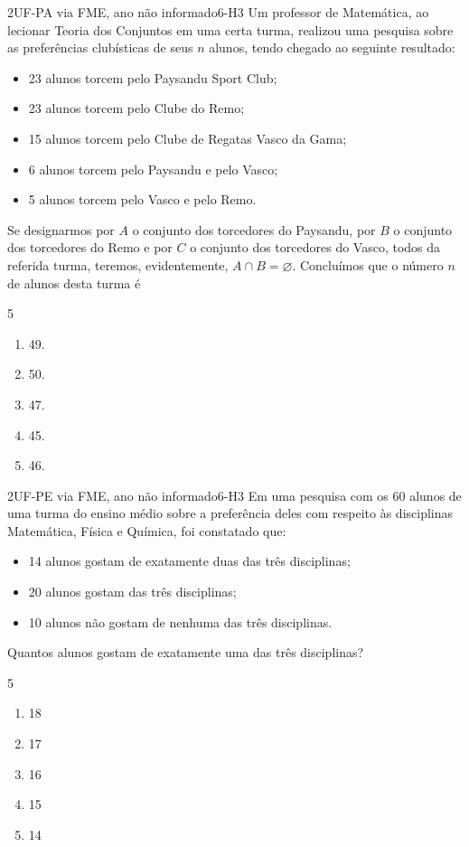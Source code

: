 \begin{questao}{2}{UF-PA via FME, ano não informado}{6-H3}\label{u6:ufpa26}
Um professor de Matemática, ao lecionar Teoria dos Conjuntos em uma certa turma, realizou uma pesquisa sobre as preferências clubísticas de seus $n$ alunos, tendo chegado ao seguinte resultado:
\begin{itemize}[leftmargin=1.4em,itemsep=0pt]
  \item 23 alunos torcem pelo Paysandu Sport Club;
  \item 23 alunos torcem pelo Clube do Remo;
  \item 15 alunos torcem pelo Clube de Regatas Vasco da Gama;
  \item 6 alunos torcem pelo Paysandu e pelo Vasco;
  \item 5 alunos torcem pelo Vasco e pelo Remo.
\end{itemize}
Se designarmos por $A$ o conjunto dos torcedores do Paysandu, por $B$ o conjunto dos torcedores do Remo e por $C$ o conjunto dos torcedores do Vasco, todos da referida turma, teremos, evidentemente, $A\cap B=\varnothing$. Concluímos que o número $n$ de alunos desta turma é
\begin{multicols}{5}
\begin{enumerate}[label=\alph*)]
  \item 49.
  \item 50.
  \item 47.
  \item 45.
  \item 46.
\end{enumerate}
\end{multicols}
\end{questao}

\begin{questao}{2}{UF-PE via FME, ano não informado}{6-H3}\label{u6:ufpe31}
Em uma pesquisa com os 60 alunos de uma turma do ensino médio sobre a preferência deles com respeito às disciplinas Matemática, Física e Química, foi constatado que:
\begin{itemize}[leftmargin=1.4em,itemsep=0pt]
  \item 14 alunos gostam de exatamente duas das três disciplinas;
  \item 20 alunos gostam das três disciplinas;
  \item 10 alunos não gostam de nenhuma das três disciplinas.
\end{itemize}
Quantos alunos gostam de exatamente uma das três disciplinas?
\begin{multicols}{5}
\begin{enumerate}[label=\alph*)]
  \item 18
  \item 17
  \item 16
  \item 15
  \item 14
\end{enumerate}
\end{multicols}
\end{questao}


